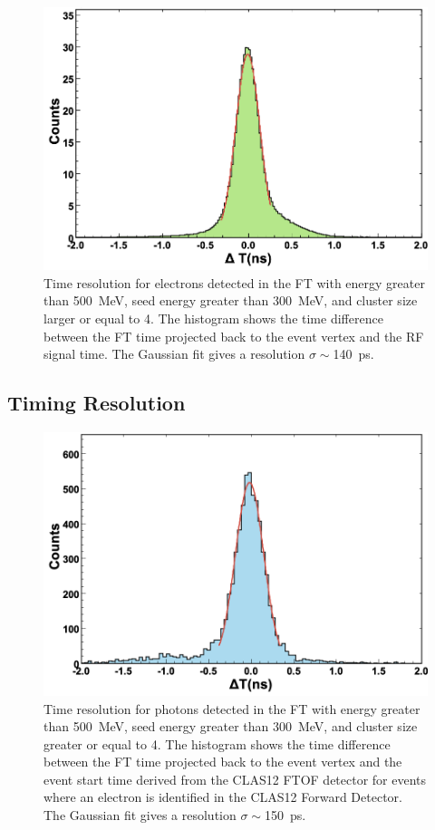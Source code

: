 \begin{figure}[h]
\includegraphics[height=0.6\columnwidth]{fig/ft_electron_time.png}
\caption{Time resolution for electrons detected in the FT with energy greater than 500~MeV, seed
  energy greater than 300~MeV, and cluster size larger or equal to 4. The histogram shows the time difference
  between the FT time projected back to the event vertex and the RF signal time. The Gaussian fit gives a resolution
  $\sigma \sim$140~ps.}
\label{fig:electron_time}
\end{figure}

\subsection{Timing Resolution}

\begin{figure}[h]
\includegraphics[height=0.6\columnwidth]{fig/ft_gamma_time.png}
\caption{Time resolution for photons detected in the FT with energy greater than 500~MeV, seed
  energy greater than 300~MeV, and cluster size greater or equal to 4. The histogram shows the time difference
  between the FT time projected back to the event vertex and the event start time derived from the CLAS12 FTOF
  detector for events where an electron is identified in the CLAS12 Forward Detector. The Gaussian fit gives a
  resolution $\sigma \sim$150~ps. }
\label{fig:gamma_time}
\end{figure}

